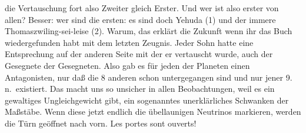 \documentclass[
]{article}
\begin{document}
\begin{enumerate}
  die Vertauschung fort also Zweiter gleich Erster. Und wer ist also
  erster von allen? Besser: wer sind die ersten: es sind doch Yehuda (1)
  und der immere Thomaszwiling-sei-leise (2). Warum, das erklärt die
  Zukunft wenn ihr das Buch wiedergefunden habt mit dem letzten Zeugnis.
  Jeder Sohn hatte eine Entsprechung auf der anderen Seite mit der er
  vertauscht wurde, auch der Gesegnete der Gesegneten. Also gab es für
  jeden der Planeten einen Antagonisten, nur daß die 8 anderen schon
  untergegangen sind und nur jener 9. n.~existiert. Das macht uns so
  unsicher in allen Beobachtungen, weil es ein gewaltiges
  Ungleichgewicht gibt, ein sogenanntes unerklärliches Schwanken der
  Maßstäbe. Wenn diese jetzt endlich die übellaunigen Neutrinos
  markieren, werden die Türn geöffnet nach vorn. Les portes sont
  ouverts!
\end{enumerate}
\end{document}
